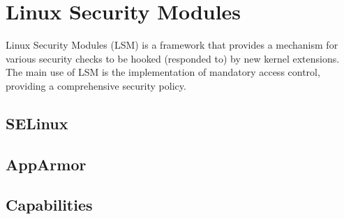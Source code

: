 
\section{Linux Security Modules}

Linux Security Modules (LSM) is a framework that provides a mechanism for
various security checks to be hooked (responded to) by new kernel
extensions\cite{wright-et-al-2002,lsm.txt}. The main use of LSM is the
implementation of mandatory access control, providing a comprehensive security
policy.

\subsection{SELinux}

\subsection{AppArmor}

\subsection{Capabilities}

